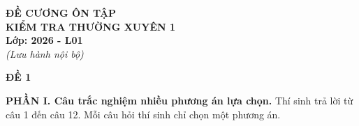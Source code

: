 \documentclass[12pt]{article}
\begin{document}
	
	\begin{titlepage}
		\centering
		\vspace*{4cm}
		
		{\Huge \textbf{ĐỀ CƯƠNG ÔN TẬP}}\\[1cm]
		{\LARGE \textbf{KIỂM TRA THƯỜNG XUYÊN 1}}\\[1.5cm]
		
		{\Large \textbf{Lớp: 2026 - L01}}\\[0.5cm]
		
		{\large \textit{(Lưu hành nội bộ)}}
		
		\vfill
	\end{titlepage}
	
	\newpage %
	\begin{center}
		{\LARGE \textbf{ĐỀ 1}}\\[4pt]
	\end{center}
	\vspace{4mm}
	
	\noindent\textbf{PHẦN I. Câu trắc nghiệm nhiều phương án lựa chọn.} Thí sinh trả lời từ câu 1 đến câu 12. Mỗi câu hỏi thí sinh chỉ chọn một phương án.
	\vspace{2mm}
	
\end{document}
